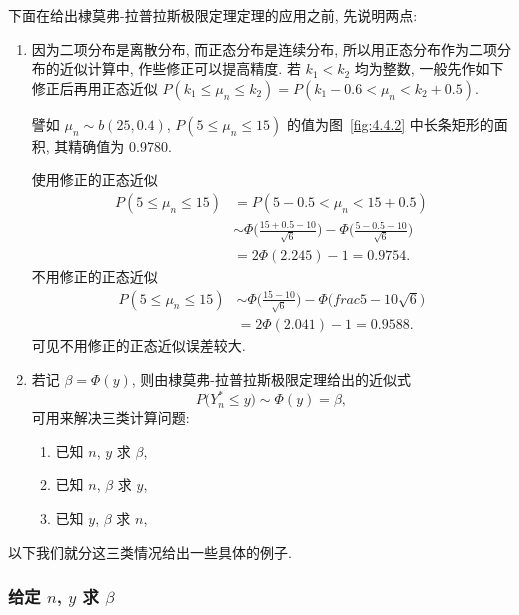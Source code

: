 下面在给出棣莫弗-拉普拉斯极限定理定理的应用之前, 先说明两点:
\begin{enumerate}
    \item 因为二项分布是离散分布, 而正态分布是连续分布, 所以用正态分布作为二项分布的近似计算中, 作些修正可以提高精度.
    若 $ k_1 < k_2 $ 均为整数, 一般先作如下修正后再用正态近似 $ P ( k_1 \leq \mu_n \leq k_2) = P ( k_1 - 0.6 < \mu_n < k_2 + 0.5 ) $.

    譬如 $ \mu_n \sim b (25, 0.4) $, $ P ( 5 \leq \mu_n \leq 15) $ 的值为图~\ref{fig:4.4.2} 中长条矩形的面积, 其精确值为 \num{0.9780}.

    使用修正的正态近似
    \begin{align*}
        P ( 5 \leq \mu_n \leq 15) & = P ( 5 - 0.5 < \mu_n < 15 + 0.5 )\\
        & \sim \Phi \biggl( \frac{15 + 0.5 -10}{\sqrt{6}} \biggr) - \Phi \biggl( \frac{5 - 0.5 - 10}{\sqrt{6}} \biggr)\\
        & = 2 \Phi (2.245) - 1 = 0.9754.
    \end{align*}
    不用修正的正态近似
    \begin{align*}
        P ( 5 \leq \mu_n \leq 15) & \sim \Phi \biggl( \frac{15 -10}{\sqrt{6}} \biggr) - \Phi \biggl( frac{5 - 10}{\sqrt{6}} \biggr)\\
        & = 2 \Phi (2.041) - 1 = 0.9588.
    \end{align*}
    可见不用修正的正态近似误差较大.

    \item 若记 $ \beta = \Phi (y) $, 则由棣莫弗-拉普拉斯极限定理给出的近似式
    \begin{equation*}
        P \bigl( Y_n^* \leq y \bigr) \sim \Phi (y) = \beta,
    \end{equation*}
    可用来解决三类计算问题:
    \begin{enumerate}
        \item 已知 $n$, $y$ 求 $\beta$,
        \item 已知 $n$, $\beta$ 求 $y$,
        \item 已知 $y$, $\beta$ 求 $n$,
    \end{enumerate}
\end{enumerate}

以下我们就分这三类情况给出一些具体的例子.

\subsubsection{给定 $n$, $y$ 求 $\beta$}

